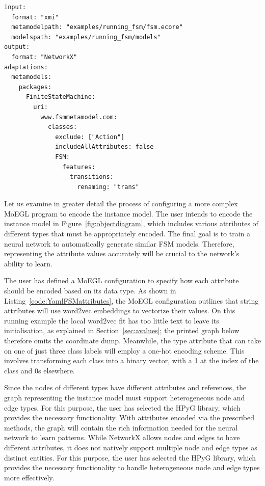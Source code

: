 \documentclass[journal,article,submit,moreauthors,technologies]{Definitions/mdpi}
\newcommand{\rev}[1]{#1}
\begin{document}
\begin{program_}[H]
\footnotesize
\begin{verbatim}
input:
  format: "xmi"
  metamodelpath: "examples/running_fsm/fsm.ecore"
  modelspath: "examples/running_fsm/models"
output:
  format: "NetworkX"
adaptations:
  metamodels:
    packages:
      FiniteStateMachine:
        uri:
          www.fsmmetamodel.com:
            classes:
              exclude: ["Action"]
              includeAllAttributes: false
              FSM:
                features:
                  transitions:
                    renaming: "trans"
\end{verbatim}
\caption{\rev{The configuration that produces Matrix~\ref{mat:matrix}. The class key is the EClass name \texttt{FSM}.}}
\label{code:YamlFSM}
\end{program_}

Let us examine in greater detail the process of configuring a more complex MoEGL program to encode the instance model. The user intends to encode the instance model in Figure~\ref{fig:objectdiagram}, which includes various attributes of different types that must be appropriately encoded. The final goal is to train a neural network to automatically generate similar FSM models. Therefore, representing the attribute values accurately will be crucial to the network's ability to learn.

The user has defined a MoEGL configuration to specify how each attribute should be encoded based on its data type. As shown in Listing~\ref{code:YamlFSMattributes}, the MoEGL configuration outlines that string attributes will use word2vec embeddings to vectorize their values. \rev{On this running example the local word2vec fit has too little text to leave its initialisation, as explained in Section~\ref{sec:avalues}; the printed graph below therefore omits the coordinate dump.} Meanwhile, the type attribute that can take on one of just three class labels will employ a one-hot encoding scheme. This involves transforming each class into a binary vector, with a 1 at the index of the class and 0s elsewhere.

Since the nodes of different types have different attributes and references, the graph representing the instance model must support heterogeneous node and edge types. For this purpose, the user has selected the HPyG library, which provides the necessary functionality. With attributes encoded via the prescribed methods, the graph will contain the rich information needed for the neural network to learn patterns. While NetworkX allows nodes and edges to have different attributes, it does not natively support multiple node and edge types as distinct entities. For this purpose, the user has selected the HPyG library, which provides the necessary functionality to handle heterogeneous node and edge types more effectively.
\end{document}
